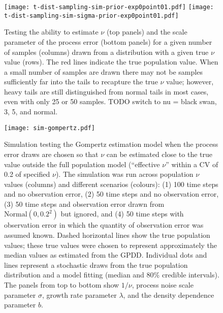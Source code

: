 \begin{figure}[htbp]
\begin{center}
\texttt{[image: t-dist-sampling-sim-prior-exp0point01.pdf]}
\texttt{[image: t-dist-sampling-sim-sigma-prior-exp0point01.pdf]}
\caption{
  Testing the ability to estimate $\nu$ (top panels) and the scale parameter of the process error (bottom panels) for a given number of samples (columns) drawn from a distribution with a given true $\nu$ value (rows). The red lines indicate the true population value. When a small number of samples are drawn there may not be samples sufficiently far into the tails to recapture the true $\nu$ value; however, heavy tails are still distinguished from normal tails in most cases, even with only 25 or 50 samples. TODO switch to nu = black swan, 3, 5, and normal.
}
\label{fig:sim-nu}
\end{center}
\end{figure}

\clearpage

\begin{figure}[htbp]
\begin{center}
\texttt{[image: sim-gompertz.pdf]}
\caption{Simulation testing the Gompertz estimation model when the process error draws are chosen so that $\nu$ can be estimated close to the true value outside the full population model (``effective $\nu$'' within a CV of 0.2 of specified $\nu$).
  The simulation was run across population $\nu$ values (columns) and different scenarios (colours): (1) 100 time steps and no observation error, (2) 50 time steps and no observation error, (3) 50 time steps and observation error drawn from $\mathrm{Normal} (0, 0.2^2)$ but ignored, and (4) 50 time steps with observation error in which the quantity of observation error was assumed known.
  Dashed horizontal lines show the true population values;
  these true values were chosen to represent approximately the median values as estimated from the GPDD.
  Individual dots and lines represent a stochastic draws from the true population distribution and a model fitting (median and 80\% credible intervals).
  The panels from top to bottom show $1/\nu$, process noise scale parameter $\sigma$, growth rate parameter $\lambda$, and the density dependence parameter $b$.}
\label{fig:sim-gompertz}
\end{center}
\end{figure}

